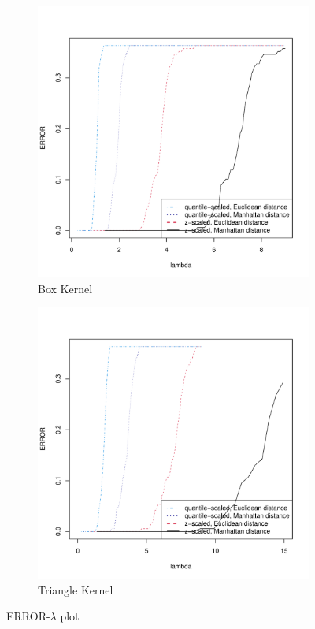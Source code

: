 \documentclass[12pt]{article}
\begin{document}
\begin{figure}[htbp]
\centering
\begin{subfigure}{0.6\textwidth}
    \includegraphics[width=\textwidth]{ERROR-lambda}
    \caption{Box Kernel}
    \label{fig:first}
\end{subfigure}
\hfill
\begin{subfigure}{0.6\textwidth}
    \includegraphics[width=\textwidth]{ERROR-lambda2}
    \caption{Triangle Kernel}
    \label{fig:second}
\end{subfigure}
        
\caption{ERROR-$\lambda$ plot}
\label{fig:result}
\end{figure}
\end{document}
